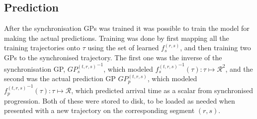 \subsection{Prediction}
After the synchronisation GPs was trained it was possible to train the model for making the actual predictions. Training was done by first mapping all the training trajectories onto $\tau$ using the set of learned  $f^{(r,s)}_s$, and then training two GPs to the synchronised trajectory. The first one was the inverse of the synchronisation GP, ${GP_s^{(t, r,s)}}^{-1}$, which modeled ${f^{(t, r,s)}_s}^{-1}(\tau) : \tau \mapsto \mathcal{R}^2$, and the second was the actual prediction GP $GP_p^{(t,r,s)}$, which modeled ${f^{(t,r,s)}_p}^{-1}(\tau) : \tau \mapsto \mathcal{R}$, which predicted arrival time as a scalar from synchronised progression. Both of these were stored to disk, to be loaded as needed when presented with a new trajectory on the corresponding segment $(r, s)$.


